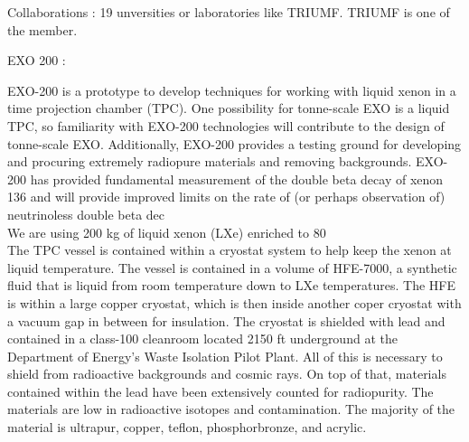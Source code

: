 \documentclass[a4paper, 11pt]{report}%
\begin{document}
  Collaborations : 19 unversities or laboratories like TRIUMF. TRIUMF is one of the member. 
  
  EXO 200 : 
  
  EXO-200 is a prototype to develop techniques for working with liquid xenon in a time projection chamber (TPC). One possibility for tonne-scale EXO is a liquid TPC, so familiarity with EXO-200 technologies will contribute to the design of tonne-scale EXO. Additionally, EXO-200 provides a testing ground for developing and procuring extremely radiopure materials and removing backgrounds. EXO-200 has provided fundamental measurement of the double beta decay of xenon 136 and will provide improved limits on the rate of (or perhaps observation of) neutrinoless double beta dec
  \\
  
  We are using 200 kg of liquid xenon (LXe) enriched to 80%
  \\
  
  The TPC vessel is contained within a cryostat system to help keep the xenon at liquid temperature. The vessel is contained in a volume of HFE-7000, a synthetic fluid that is liquid from room temperature down to LXe temperatures. The HFE is within a large copper cryostat, which is then inside another coper cryostat with a vacuum gap in between for insulation. The cryostat is shielded with lead and contained in a class-100 cleanroom located 2150 ft underground at the Department of Energy's Waste Isolation Pilot Plant. All of this is necessary to shield from radioactive backgrounds and cosmic rays. On top of that, materials contained within the lead have been extensively counted for radiopurity. The materials are low in radioactive isotopes and contamination. The majority of the material is ultrapur, copper, teflon, phosphorbronze, and acrylic. 
  \\
  
\end{document}
